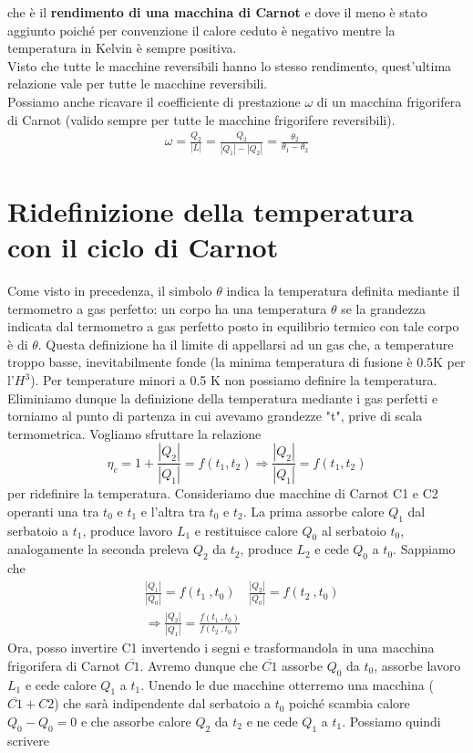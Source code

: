\documentclass[10pt,a4paper]{article}
\begin{document}
che è il \textbf{rendimento di una macchina di Carnot} e dove il meno è stato aggiunto poiché per convenzione il calore ceduto è negativo mentre la temperatura in Kelvin è sempre positiva.\\
Visto che tutte le macchine reversibili hanno lo stesso rendimento, quest'ultima relazione vale per tutte le macchine reversibili.\\
Possiamo anche ricavare il coefficiente di prestazione $\omega$ di un macchina frigorifera di Carnot (valido sempre per tutte le macchine frigorifere reversibili). 
\begin{align*}
\omega = \frac{Q_2}{|L|} = \frac{Q_2}{|Q_1|-|Q_2|} = \frac{\theta_2}{\theta_1 - \theta_2}
\end{align*}

\section{Ridefinizione della temperatura con il ciclo di Carnot}
Come visto in precedenza, il simbolo $\theta$ indica la temperatura definita mediante il termometro a gas perfetto: un corpo ha una temperatura $\theta$ se la grandezza indicata dal termometro a gas perfetto posto in equilibrio termico con tale corpo è di $\theta$. Questa definizione ha il limite di appellarsi ad un gas che, a temperature troppo basse, inevitabilmente fonde (la minima temperatura di fusione è 0.5K per l'$H^3$). Per temperature minori a 0.5 K non possiamo definire la temperatura.\\
Eliminiamo dunque la definizione della temperatura mediante i gas perfetti e torniamo al punto di partenza in cui avevamo grandezze "t", prive di scala termometrica. Vogliamo sfruttare la relazione \[\eta_c = 1+\frac{|Q_2|}{|Q_1|}=f(t_1,t_2) \Rightarrow \frac{|Q_2|}{|Q_1|}=f(t_1,t_2)\]
per ridefinire la temperatura. Consideriamo due macchine di Carnot C1 e C2 operanti una tra $t_0$ e $t_1$ e l'altra tra $t_0$ e $t_2$. La prima assorbe calore \(Q_1\) dal serbatoio a \(t_1\), produce lavoro \( L_1\) e restituisce calore \(Q_0\) al serbatoio \(t_0\), analogamente la seconda preleva \(Q_2\) da \(t_2\), produce \(L_2\) e cede \(Q_0\) a \(t_0\). Sappiamo che
\begin{align*}
	&\frac{|Q_1|}{|Q_0|} =f(t_1\ , t_0) \quad \frac{|Q_2|}{|Q_0|} =f(t_2\ , t_0)\\
	&\Rightarrow \frac{|Q_2|}{|Q_1|} =\frac{f(t_1\ , t_0)}{f(t_2\ , t_0)}
\end{align*}
Ora, posso invertire C1 invertendo i segni e trasformandola in una macchina frigorifera di Carnot $\overline{C1}$. Avremo dunque che $\overline{C1}$ assorbe \(Q_0\) da \(t_0\), assorbe lavoro \(L_1\) e cede calore \(Q_1\) a \(t_1\). Unendo le due macchine otterremo una macchina ($\overline{C1}+C2$) che sarà indipendente dal serbatoio a \(t_0\) poiché scambia calore \(Q_0-Q_0 =  0\) e che assorbe calore \(Q_2\) da \(t_2\) e ne cede \(Q_1\) a \(t_1\). Possiamo quindi scrivere
\end{document}
